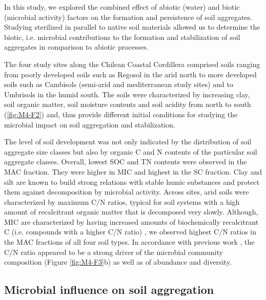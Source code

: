 In this study, we explored the combined effect of abiotic (water) and biotic (microbial activity) factors on the formation and persistence of soil aggregates. Studying sterilized in parallel to native soil materials allowed us to determine the biotic, i.e. microbial contributions to the formation and stabilization of soil aggregates in comparison to abiotic processes.

The four study sites along the Chilean Coastal Cordillera comprised soils ranging from poorly developed soils such as Regosol in the arid north to more developed soils such as Cambisols (semi-arid and mediterranean study sites) and to Umbrisols in the humid south. The soils were characterized by increasing clay, soil organic matter, soil moisture contents and soil acidity from north to south \citep{Bernhard2018} (\ref{fig:M4-F2}) and, thus provide different initial conditions for studying the microbial impact on soil aggregation and stabilization.

The level of soil development was not only indicated by the distribution of soil aggregate size classes but also by organic C and N contents of the particular soil aggregate classes. Overall, lowest SOC and TN contents were observed in the MAC fraction. They were higher in MIC and highest in the SC fraction. Clay and silt are known to build strong relations with stable humic substances \citep{Bouajila2021} and protect them against decomposition by microbial activity. Across sites, arid soils were characterized by maximum C/N ratios, typical for soil systems with a high amount of recalcitrant organic matter that is decomposed very slowly. Although, MIC are characterized by having increased amounts of biochemically recalcitrant C (i.e. compounds with a higher C/N ratio) \citep{Elliott1986, Kravchenko2015}, we observed highest C/N ratios in the MAC fractions of all four soil types. In accordance with previous work \citep{Kuramae2012}, the C/N ratio appeared to be a strong driver of the microbial community composition (Figure \ref{fig:M4-F3}b) as well as of abundance and diversity.

\subsection{Microbial influence on soil aggregation}

